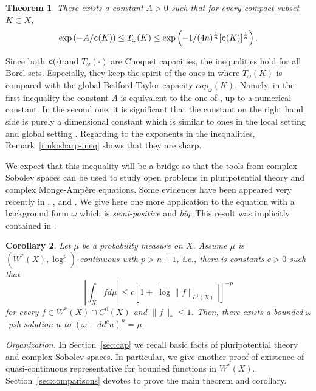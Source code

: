 \documentclass{amsart}
\newcommand{\om}{\omega}
\newcommand{\tc}{{\tt c}}
\newtheorem{thm}{Theorem}
\newtheorem{cor}[thm]{Corollary}
\theoremstyle{definition}
\numberwithin{thm}{section}
\numberwithin{equation}{section}
\renewcommand{\[}{\begin{equation}}
\renewcommand{\]}{\end{equation}}
\begin{document}
\begin{thm} \label{thm:AT-c-intro} There exists a constant $A>0$ such that for every compact subset  $K\subset X$, 
$$	\exp\left( - A/ \tc(K) \right) \leq T_\om(K)   \leq  \exp\left( - 1 / (4n)^\frac{1}{n}   [\tc(K)]^\frac{1}{n}\right).
$$
\end{thm}
Since both $\tc(\cdot)$ and $T_\om(\cdot)$ are Choquet capacities,  the inequalities hold for all Borel sets. Especially, 
they keep the spirit of the ones in  \cite[Lemmas~12.2, 12.3]{GZ-book} where $T_\om(K)$ is compared with the global Bedford-Taylor capacity $cap_\om(K)$. Namely, in the first inequality the constant $A$ is equivalent to the one of \cite[Lemma~12.3]{GZ-book}, up to a numerical constant. In the second one, it is significant that the constant on the right hand side is purely a dimensional constant which is similar to ones in  the local setting \cite{AT84} and global setting \cite[Lemma~12.1]{GZ-book}.  Regarding to the exponents in the inequalities, Remark~\ref{rmk:sharp-ineq} shows that they are sharp.

We expect that this inequality will be a bridge so that the tools from complex Sobolev spaces can be used to study open problems in pluripotential theory and  complex Monge-Amp\`ere equations. Some evidences have been appeared very recently in  \cite{DoN25}, \cite{DKN}, \cite{VV24} and \cite{Vu24, Vu26}.  We give here one more application to the equation with a background form $\om$ which is  {\em semi-positive} and {\em big}. This result  was implicitly contained in \cite[Theorem~3.6]{DKN}. 


\begin{cor} \label{cor:ma-intro} Let  $\mu$ be a probability measure on $X$. Assume $\mu$ is $(W^*(X), \log^p)$-continuous with $p>n+1$, i.e., there is constants $c>0$ such that
$$
	\left| \int_X f d\mu  \right| \leq c \left[ 1+ |\log \|f\|_{L^1(X)}|\right]^{-p} 
$$ for every $f \in W^*(X) \cap C^0(X)$ and $\|f\|_*\leq 1$. Then, there exists a bounded $\om$-psh solution $u$ to  $(\om + dd^c u)^n = \mu.$
\end{cor}


\bigskip


{\em Organization.} In Section~\ref{sec:cap} we recall basic facts of pluripotential theory and complex Sobolev spaces. In particular, we give another proof of existence of quasi-continuous representative for bounded functions in $W^*(X)$. Section~\ref{sec:comparisons} devotes to prove the main theorem and corollary.

\bigskip
\end{document}
